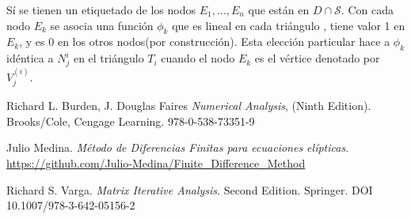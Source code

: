 \documentclass[a4paper]{article}
\begin{document}
Sí se tienen un etiquetado de los nodos $E_1,\hdots,E_n$ que están en $D\cap \mathcal{S}$. Con cada nodo $E_k$ se asocia una función $\phi_k$ que es lineal en cada triángulo , tiene valor 1 en $E_k$, y es $0$ en los otros nodos(por construcción). Esta elección particular hace a $\phi_k$ idéntica a $N_j^{i}$ en el triángulo $T_i$ cuando el nodo $E_k$ es el vértice denotado por $V_j^{(i)}$.
\begin{thebibliography}{99}


 Richard L. Burden, J. Douglas Faires \textit{Numerical Analysis}, (Ninth Edition). Brooks/Cole, Cengage Learning. 978-0-538-73351-9

 Julio Medina. \textit{Método de Diferencias Finitas para ecuaciones elípticas}. \url{https://github.com/Julio-Medina/Finite_Difference_Method}

 Richard S. Varga. \textit{Matrix Iterative Analysis}. Second Edition. Springer. DOI 10.1007/978-3-642-05156-2






\end{thebibliography}
\end{document}
